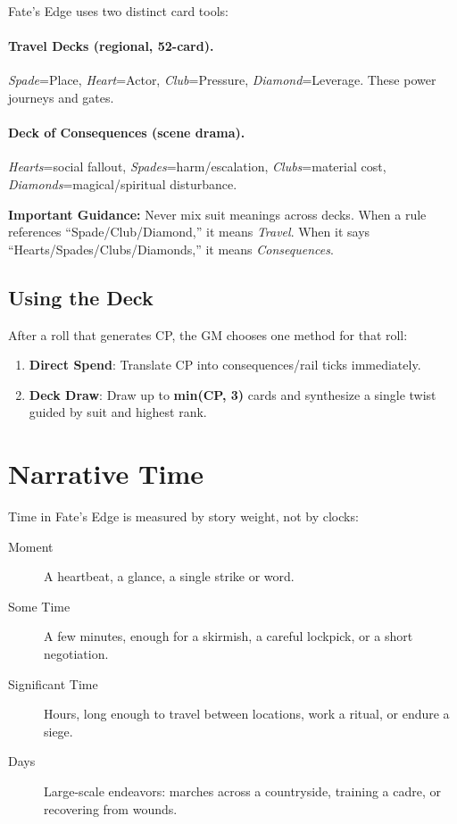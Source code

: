 Fate's Edge uses two distinct card tools:

\paragraph{Travel Decks (regional, 52-card).}
\emph{Spade}=Place, \emph{Heart}=Actor, \emph{Club}=Pressure, \emph{Diamond}=Leverage. These power journeys and gates.

\paragraph{Deck of Consequences (scene drama).}
\emph{Hearts}=social fallout, \emph{Spades}=harm/escalation, \emph{Clubs}=material cost, \emph{Diamonds}=magical/spiritual disturbance.

\textbf{Important Guidance:} Never mix suit meanings across decks. When a rule references ``Spade/Club/Diamond,'' it means \emph{Travel}. When it says ``Hearts/Spades/Clubs/Diamonds,'' it means \emph{Consequences}.

\subsection*{Using the Deck}

After a roll that generates CP, the GM chooses one method for that roll:
\begin{enumerate}
  \item \textbf{Direct Spend}: Translate CP into consequences/rail ticks immediately.
  \item \textbf{Deck Draw}: Draw up to \textbf{min(CP, 3)} cards and synthesize a single twist guided by suit and highest rank.
\end{enumerate}

\section{Narrative Time}

Time in Fate's Edge is measured by story weight, not by clocks:
\begin{description}
  \item[Moment]  A heartbeat, a glance, a single strike or word.
  \item[Some Time]  A few minutes, enough for a skirmish, a careful lockpick, or a short negotiation.
  \item[Significant Time]  Hours, long enough to travel between locations, work a ritual, or endure a siege.
  \item[Days]  Large-scale endeavors: marches across a countryside, training a cadre, or recovering from wounds.
\end{description}

